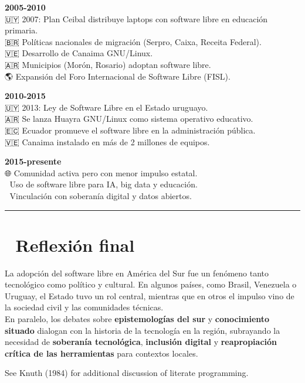 \documentclass[
  letterpaper,
  DIV=11,
  numbers=noendperiod]{scrreprt}
\begin{document}
\textbf{2005-2010}\\
🇺🇾 2007: Plan Ceibal distribuye laptops con software libre en educación
primaria.\\
🇧🇷 Políticas nacionales de migración (Serpro, Caixa, Receita Federal).\\
🇻🇪 Desarrollo de Canaima GNU/Linux.\\
🇦🇷 Municipios (Morón, Rosario) adoptan software libre.\\
🌎 Expansión del Foro Internacional de Software Libre (FISL).

\textbf{2010-2015}\\
🇺🇾 2013: Ley de Software Libre en el Estado uruguayo.\\
🇦🇷 Se lanza Huayra GNU/Linux como sistema operativo educativo.\\
🇪🇨 Ecuador promueve el software libre en la administración pública.\\
🇻🇪 Canaima instalado en más de 2 millones de equipos.

\textbf{2015-presente}\\
🌐 Comunidad activa pero con menor impulso estatal.\\
🤖 Uso de software libre para IA, big data y educación.\\
👥 Vinculación con soberanía digital y datos abiertos.

\begin{center}\rule{0.5\linewidth}{0.5pt}\end{center}

\section{🧠 Reflexión final}\label{reflexiuxf3n-final}

La adopción del software libre en América del Sur fue un fenómeno tanto
tecnológico como político y cultural. En algunos países, como Brasil,
Venezuela o Uruguay, el Estado tuvo un rol central, mientras que en
otros el impulso vino de la sociedad civil y las comunidades técnicas.\\
En paralelo, los debates sobre \textbf{epistemologías del sur} y
\textbf{conocimiento situado} dialogan con la historia de la tecnología
en la región, subrayando la necesidad de \textbf{soberanía tecnológica},
\textbf{inclusión digital} y \textbf{reapropiación crítica de las
herramientas} para contextos locales.

See Knuth (1984) for additional discussion of literate programming.
\end{document}
